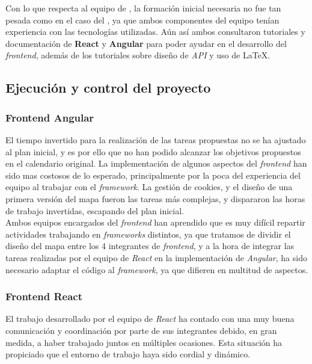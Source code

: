 \documentclass[11pt, a4paper, titlepage]{article}
\begin{document}
Con lo que respecta al equipo de , la formación inicial necesaria no fue tan pesada como en el caso del , ya que ambos componentes del equipo tenían experiencia con las tecnologías utilizadas. Aún así ambos consultaron tutoriales y documentación de \textbf{React} y \textbf{Angular} para poder ayudar en el desarrollo del \textit{frontend}, además de los tutoriales sobre diseño de \textit{API} y uso de \LaTeX.

\subsection{Ejecución y control del proyecto}
\subsubsection{Frontend Angular}

El tiempo invertido para la realización de las tareas propuestas no se ha ajustado al plan inicial, y es por ello que no han podido alcanzar los objetivos propuestos en el calendario original. La implementación de algunos aspectos del \textit{frontend} han sido mas costosos de lo esperado, principalmente por la poca del experiencia del equipo al trabajar con el \textit{framework}. La gestión de cookies, y el diseño de una primera versión del mapa fueron las tareas más complejas, y dispararon las horas de trabajo invertidas, escapando del plan inicial.\\

Ambos equipos encargados del \textit{frontend} han aprendido que es muy difícil repartir actividades trabajando en \textit{frameworks} distintos, ya que tratamos de dividir el diseño del mapa entre los 4 integrantes de \textit{frontend}, y a la hora de integrar las tareas realizadas por el equipo de \textit{React} en la implementación de \textit{Angular}, ha sido necesario adaptar el código al \textit{framework}, ya que difieren en multitud de aspectos. 

\subsubsection{Frontend React}


El trabajo desarrollado por el equipo de \textit{React} ha contado con una muy buena comunicación y coordinación por parte de sus integrantes debido, en gran medida, a haber trabajado juntos en múltiples ocasiones. Esta situación ha propiciado que el entorno de trabajo haya sido cordial y dinámico. \\
\end{document}
